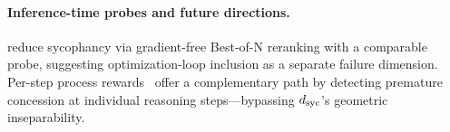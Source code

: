 \paragraph{Inference-time probes and future directions.}
\citet{papadatos2024probepenalties} reduce sycophancy via gradient-free Best-of-N reranking with a comparable probe, suggesting optimization-loop inclusion as a separate failure dimension.
Per-step process rewards~\citep{beigi2025smart} offer a complementary path by detecting premature concession at individual reasoning steps---bypassing $d_{\text{syc}}$'s geometric inseparability.
